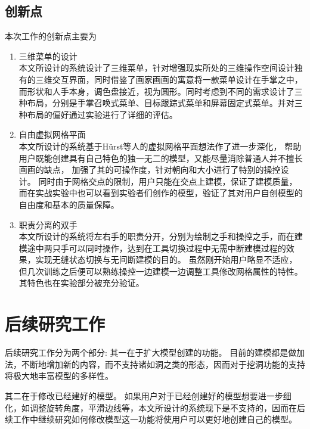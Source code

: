 \subsection{创新点}
本次工作的创新点主要为
\begin{enumerate}
\item 三维菜单的设计\hfill\\
本文所设计的系统设计了三维菜单，针对增强现实所处的三维操作空间设计独有的三维交互界面，同时借鉴了画家画画的寓意将一款菜单设计在手掌之中，而形状和人手本身，调色盘接近，视为圆形。同时考虑到不同的需求设计了三种布局，分别是手掌召唤式菜单、目标跟踪式菜单和屏幕固定式菜单。并对三种布局的偏好通过实验进行了详细的评估。
\item 自由虚拟网格平面 \hfill\\
本文所设计的系统基于H{\"u}rst等人的虚拟网格平面想法作了进一步深化，
帮助用户既能创建具有自己特色的独一无二的模型，又能尽量消除普通人并不擅长画画的缺点，
加强了其的可操作度，针对朝向和大小进行了特别的操控设计。
同时由于网格交点的限制，用户只能在交点上建模，保证了建模质量，而在实战实验中也可以看到实验者们创作的模型，验证了其对用户自创模型的自由度和基本的质量保障。

\item 职责分离的双手\hfill\\
本文所设计的系统将左右手的职责分开，分别为绘制之手和操控之手，而在建模途中两只手可以同时操作，达到在工具切换过程中无需中断建模过程的效果，实现无缝状态切换与无间断建模的目的。
虽然刚开始用户略显不适应，但几次训练之后便可以熟练操控一边建模一边调整工具修改网格属性的特性。其特色也在实验部分被充分验证。

\end{enumerate}

\section{后续研究工作}
后续研究工作分为两个部分:
其一在于扩大模型创建的功能。
目前的建模都是做加法，不断地增加新的内容，而不支持诸如洞之类的形态，因而对于挖洞功能的支持将极大地丰富模型的多样性。

其二在于修改已经建好的模型。
如果用户对于已经创建好的模型想要进一步细化，如调整旋转角度，平滑边线等，本文所设计的系统现下是不支持的，因而在后续工作中继续研究如何修改模型这一功能将使用户可以更好地创建自己的模型。
